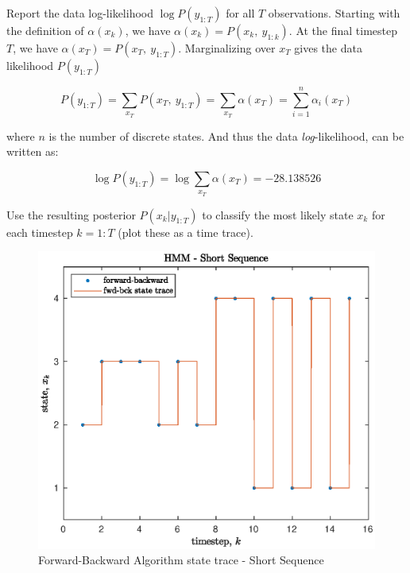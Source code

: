 \documentclass[]{article}
\begin{document}
\noindent Report the data log-likelihood $\log P(y_{1:T})$ for all $T$ observations. Starting with the definition of $\alpha(x_k)$, we have $\alpha(x_k) = P(x_k, \: y_{1:k})$. At the final timestep $T$, we have $\alpha(x_T) = P(x_T, \: y_{1:T})$. Marginalizing over $x_T$ gives the data likelihood $P(y_{1:T})$

\begin{equation}
	P(y_{1:T}) = \sum_{x_T} P(x_T,\: y_{1:T}) = \sum_{x_T} \alpha(x_T) = \sum_{i=1}^n \alpha_i(x_T)
\end{equation}

where $n$ is the number of discrete states. And thus the data \emph{log}-likelihood, can be written as:

\begin{equation}
	\log P(y_{1:T}) = \log \sum_{x_T} \alpha(x_T) = -28.138526
\end{equation}

\noindent Use the resulting posterior $P(x_k \vert y_{1:T})$ to classify the most likely state $x_k$ for each timestep $k=1:T$ (plot these as a time trace).

 
\begin{figure}[H]
	\begin{center}  
		\includegraphics[scale=0.49]{p1_state_trace.eps}  
		\caption{Forward-Backward Algorithm state trace - Short Sequence}
		\label{fig:short_fb}
	\end{center}  
\end{figure}
\end{document}
